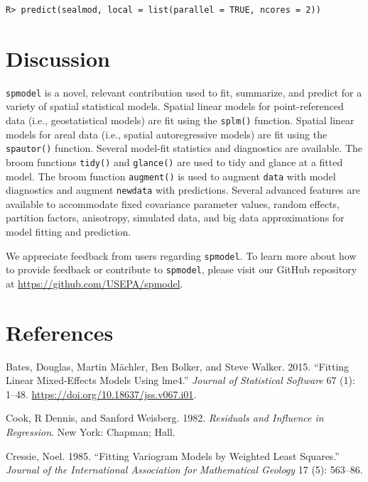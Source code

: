 \documentclass{article}
\begin{document}
\begin{verbatim}
R> predict(sealmod, local = list(parallel = TRUE, ncores = 2))
\end{verbatim}

\hypertarget{sec:discussion}{%
\section{Discussion}\label{sec:discussion}}

\texttt{spmodel} is a novel, relevant contribution used to fit,
summarize, and predict for a variety of spatial statistical models.
Spatial linear models for point-referenced data (i.e., geostatistical
models) are fit using the \texttt{splm()} function. Spatial linear
models for areal data (i.e., spatial autoregressive models) are fit
using the \texttt{spautor()} function. Several model-fit statistics and
diagnostics are available. The broom functions \texttt{tidy()} and
\texttt{glance()} are used to tidy and glance at a fitted model. The
broom function \texttt{augment()} is used to augment \texttt{data} with
model diagnostics and augment \texttt{newdata} with predictions. Several
advanced features are available to accommodate fixed covariance
parameter values, random effects, partition factors, anisotropy,
simulated data, and big data approximations for model fitting and
prediction.

We appreciate feedback from users regarding \texttt{spmodel}. To learn
more about how to provide feedback or contribute to \texttt{spmodel},
please visit our GitHub repository at
\url{https://github.com/USEPA/spmodel}.

\hypertarget{references}{%
\section*{References}\label{references}}

\hypertarget{refs}{}
\leavevmode\hypertarget{ref-bates2015lme4}{}%
Bates, Douglas, Martin Mächler, Ben Bolker, and Steve Walker. 2015.
``Fitting Linear Mixed-Effects Models Using lme4.'' \emph{Journal of
Statistical Software} 67 (1): 1--48.
\url{https://doi.org/10.18637/jss.v067.i01}.

\leavevmode\hypertarget{ref-cook1982residuals}{}%
Cook, R Dennis, and Sanford Weisberg. 1982. \emph{Residuals and
Influence in Regression}. New York: Chapman; Hall.

\leavevmode\hypertarget{ref-cressie1985fitting}{}%
Cressie, Noel. 1985. ``Fitting Variogram Models by Weighted Least
Squares.'' \emph{Journal of the International Association for
Mathematical Geology} 17 (5): 563--86.
\end{document}
